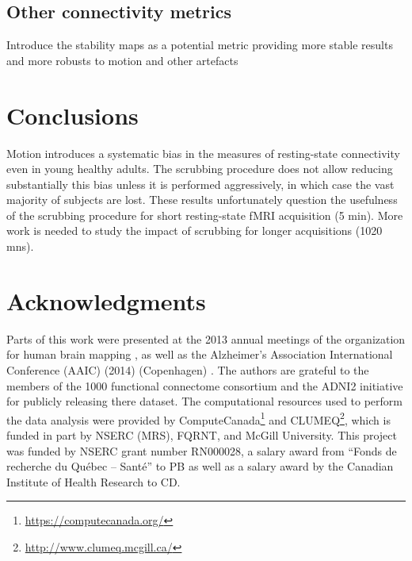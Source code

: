 \documentclass[authoryear,preprint,review]{elsarticle}
\begin{document}
 

\subsection{Other connectivity metrics}
Introduce the stability maps as a potential metric providing more stable results and more robusts to motion and other artefacts


\section{Conclusions}
Motion introduces a systematic bias in the measures of resting-­state connectivity even in young healthy adults. The scrubbing procedure does not allow reducing substantially this bias unless it is performed aggressively, in which case the vast majority of subjects are lost. These results unfortunately question the usefulness of the scrubbing procedure for short resting­-state fMRI acquisition (5 min). More work is needed to study the impact of scrubbing for longer acquisitions (10­20 mns).

\section{Acknowledgments}
Parts of this work were presented at the 2013 annual meetings of the organization for human brain mapping \citep{?}, as well as the  Alzheimer's Association International Conference (AAIC) (2014) (Copenhagen) \citep{?}. The authors are grateful to the members of the 1000 functional connectome consortium  and the ADNI2 initiative for publicly releasing there dataset. The computational resources used to perform the data analysis were provided by ComputeCanada\footnote{\url{https://computecanada.org/}} and CLUMEQ\footnote{\url{http://www.clumeq.mcgill.ca/}}, which is funded in part by NSERC (MRS), FQRNT, and McGill University. This project was funded by NSERC grant number RN000028, a salary award from ``Fonds de recherche du Qu\'ebec -- Sant\'e'' to PB as well as a salary award by the Canadian Institute of Health Research to CD.
\end{document}
